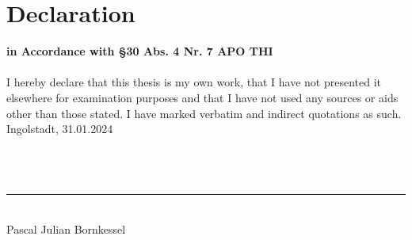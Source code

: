 \cleardoublepage
\setlength{\parindent}{0pt}
\setlength{\parskip}{10pt}	

\chapter*{Declaration}
\vspace{-40pt} %
\hspace{0.0001pt} {\normalsize \textbf{in Accordance with §30 Abs. 4 Nr. 7 APO THI}} \\ \\


I hereby declare that this thesis is my own work, that I have not presented it elsewhere
for examination purposes and that I have not used any sources or aids other than those
stated. I have marked verbatim and indirect quotations as such. \\


Ingolstadt, 31.01.2024 \\ \\ \\ \\


\rule{8cm}{0.4pt} \\
Pascal Julian Bornkessel
